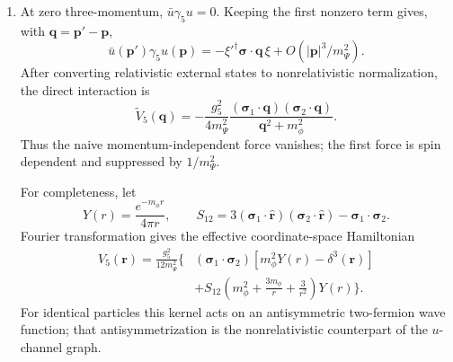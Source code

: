 \begin{enumerate}
\begin{enumerate}
\begin{enumerate}
\[\]
The relative minus sign is fixed by Fermi statistics.  These two
expressions are the complete leading-order relativistic answer.
\item
At zero three-momentum,
\(\bar u\gamma_5u=0\).  Keeping the first nonzero term gives, with
\(\mathbf q=\mathbf p'-\mathbf p\),
\[
 \bar u(\mathbf p')\gamma_5u(\mathbf p)
 =-\xi'^\dagger\boldsymbol\sigma\cdot\mathbf q\,\xi
 +O(|\mathbf p|^3/m_\Psi^2).
\]
After converting relativistic external states to nonrelativistic
normalization, the direct interaction is
\[
 \boxed{\widetilde V_5(\mathbf q)
 =-\frac{g_5^2}{4m_\Psi^2}
 \frac{(\boldsymbol\sigma_1\cdot\mathbf q)
       (\boldsymbol\sigma_2\cdot\mathbf q)}
      {\mathbf q^2+m_\phi^2}.}
\]
Thus the naive momentum-independent force vanishes; the first force is
spin dependent and suppressed by \(1/m_\Psi^2\).

For completeness, let
\[
 Y(r)=\frac{e^{-m_\phi r}}{4\pi r},\qquad
 S_{12}=3(\boldsymbol\sigma_1\cdot\widehat{\mathbf r})
          (\boldsymbol\sigma_2\cdot\widehat{\mathbf r})
          -\boldsymbol\sigma_1\cdot\boldsymbol\sigma_2.
\]
Fourier transformation gives the effective coordinate-space
Hamiltonian
\[
\begin{split}
 V_5(\mathbf r)
 =\frac{g_5^2}{12m_\Psi^2}\Bigg\{&
 (\boldsymbol\sigma_1\cdot\boldsymbol\sigma_2)
 \left[m_\phi^2Y(r)-\delta^3(\mathbf r)\right]\\
 &+S_{12}
 \left(m_\phi^2+\frac{3m_\phi}{r}+\frac{3}{r^2}\right)Y(r)
 \Bigg\}.
\end{split}
\]
For identical particles this kernel acts on an antisymmetric
two-fermion wave function; that antisymmetrization is the
nonrelativistic counterpart of the \(u\)-channel graph.
\end{enumerate}
\end{enumerate}
\end{enumerate}
